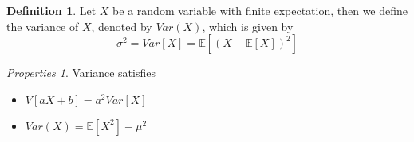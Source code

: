 \documentclass[twoside]{article}
\theoremstyle{definition}
\newtheorem{definition}{Definition}[section]
\theoremstyle{remark}
\newtheorem{properties}[theorem]{Properties}
\theoremstyle{remark}
\begin{document}
\begin{definition}
  Let $X$ be a random variable with finite expectation, then we define the variance
  of $X$, denoted by $Var(X)$, which is given by
  \begin{equation}
    {\sigma}^2 = Var [X] = \mathbb{E} [ { ( X - \mathbb{E} [X] ) }^2 ]
  \end{equation}
\end{definition}

\begin{properties}{Variance satisfies}
  \begin{itemize}
    \item $V[aX+b] = a^2 Var[X]$
    \item $Var(X) = \mathbb{E}[X^2] - \mu^2$
  \end{itemize}
\end{properties}
\end{document}
